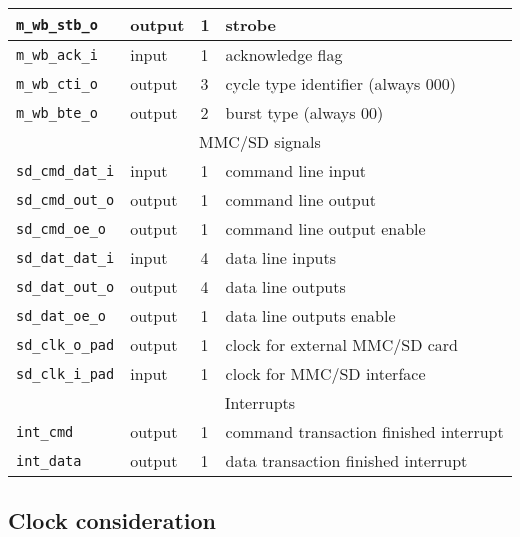 \begin{table}
\begin{center}
\begin{tabular}{l|l|l|l}
                    \texttt{m\_wb\_stb\_o} & output & 1 & strobe \\ \hline
                    \texttt{m\_wb\_ack\_i} & input & 1 & acknowledge flag \\ \hline
                    \texttt{m\_wb\_cti\_o} & output & 3 & cycle type identifier (always 000) \\ \hline
                    \texttt{m\_wb\_bte\_o} & output & 2 & burst type (always 00) \\ \hline
                    \multicolumn{4}{c}{MMC/SD signals} \\ \hline
                    \texttt{sd\_cmd\_dat\_i} & input & 1 & command line input \\ \hline
                    \texttt{sd\_cmd\_out\_o} & output & 1 & command line output \\ \hline
                    \texttt{sd\_cmd\_oe\_o} & output & 1 & command line output enable \\ \hline
                    \texttt{sd\_dat\_dat\_i} & input & 4 & data line inputs \\ \hline
                    \texttt{sd\_dat\_out\_o} & output & 4 & data line outputs \\ \hline
                    \texttt{sd\_dat\_oe\_o} & output & 1 & data line outputs enable \\ \hline
                    \texttt{sd\_clk\_o\_pad} & output & 1 & clock for external MMC/SD card \\ \hline
                    \texttt{sd\_clk\_i\_pad} & input & 1 & clock for MMC/SD interface \\ \hline
                    \multicolumn{4}{c}{Interrupts} \\ \hline
                    \texttt{int\_cmd} & output & 1 & command transaction finished interrupt \\ \hline
                    \texttt{int\_data} & output & 1 & data transaction finished interrupt \\ \hline
                    \hline
            \end{tabular}
            \label{tab:singals}
        \end{center}
    \end{table}     
    
    \subsection{Clock consideration}
    \label{sec:clock}
    
